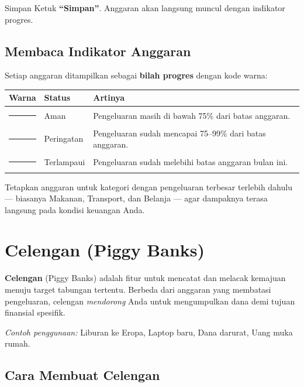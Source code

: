 \documentclass[12pt, a4paper]{article}
\begin{document}
\begin{stepbox}{Simpan}
  Ketuk \textbf{``Simpan''}. Anggaran akan langsung muncul dengan indikator progres.
\end{stepbox}

\subsection{Membaca Indikator Anggaran}

Setiap anggaran ditampilkan sebagai \textbf{bilah progres} dengan kode warna:

\begin{longtable}{C{2.5cm} L{4cm} L{7.5cm}}
  \toprule
  \textbf{Warna} & \textbf{Status} & \textbf{Artinya} \\
  \midrule
  \endhead
  {\color{budgt-green}\rule{1.5cm}{6pt}} & Aman & Pengeluaran masih di bawah 75\% dari batas anggaran. \\[4pt]
  {\color{budgt-orange}\rule{1.5cm}{6pt}} & Peringatan & Pengeluaran sudah mencapai 75--99\% dari batas anggaran. \\[4pt]
  {\color{budgt-red}\rule{1.5cm}{6pt}} & Terlampaui & Pengeluaran sudah melebihi batas anggaran bulan ini. \\
  \bottomrule
\end{longtable}

\begin{tipbox}
Tetapkan anggaran untuk kategori dengan pengeluaran terbesar terlebih dahulu --- biasanya Makanan, Transport, dan Belanja --- agar dampaknya terasa langsung pada kondisi keuangan Anda.
\end{tipbox}

\section{Celengan (Piggy Banks)}

\textbf{Celengan} (Piggy Banks) adalah fitur untuk mencatat dan melacak kemajuan menuju target tabungan tertentu. Berbeda dari anggaran yang membatasi pengeluaran, celengan \textit{mendorong} Anda untuk mengumpulkan dana demi tujuan finansial spesifik.

\textit{Contoh penggunaan:} Liburan ke Eropa, Laptop baru, Dana darurat, Uang muka rumah.

\subsection{Cara Membuat Celengan}
\end{document}
